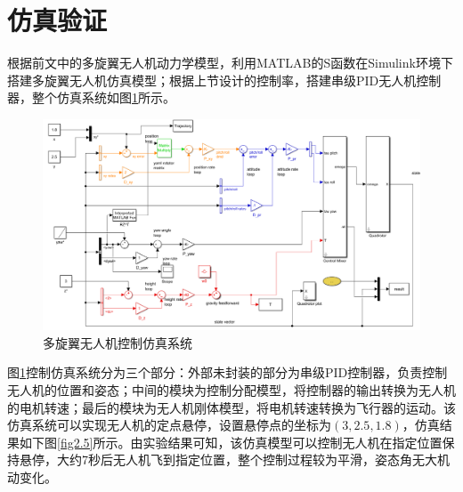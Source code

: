 \section{仿真验证}
根据前文中的多旋翼无人机动力学模型，利用MATLAB的S函数在Simulink\upcite{[2.6]}环境下搭建多旋翼无人机仿真模型；根据上节设计的控制率，搭建串级PID无人机控制器，整个仿真系统如图\ref{fig2.4}所示。
\begin{figure}[h]
\centering
    
		\includegraphics[scale=0.4]{figures/Fig2.4.png}
	
\caption{多旋翼无人机控制仿真系统}
\label{fig2.4}
\end{figure}

图\ref{fig2.4}控制仿真系统分为三个部分：外部未封装的部分为串级PID控制器，负责控制无人机的位置和姿态；中间的模块为控制分配模型，将控制器的输出转换为无人机的电机转速；最后的模块为无人机刚体模型，将电机转速转换为飞行器的运动。该仿真系统可以实现无人机的定点悬停，设置悬停点的坐标为$(3,2.5,1.8)$，仿真结果如下图\ref{fig2.5}所示。由实验结果可知，该仿真模型可以控制无人机在指定位置保持悬停，大约7秒后无人机飞到指定位置，整个控制过程较为平滑，姿态角无大机动变化。

